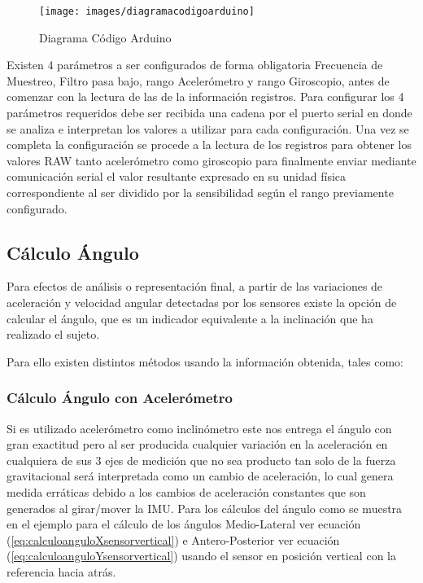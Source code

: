 \documentclass[12pt,a4paper]{article}
\begin{document}
\begin{figure}[H]
	\centering
	\texttt{[image: images/diagramacodigoarduino]}
	\caption{Diagrama Código Arduino}
	\label{fig:arduinocode}
\end{figure}

Existen 4 parámetros a ser configurados de forma obligatoria Frecuencia de Muestreo, Filtro pasa bajo, rango Acelerómetro y rango Giroscopio, antes de comenzar con la lectura de las de la información registros.
Para configurar los 4 parámetros requeridos debe ser recibida una cadena por el puerto serial en donde se analiza e interpretan los valores a utilizar para cada configuración. 
Una vez se completa la configuración se procede a la lectura de los registros para obtener los valores RAW tanto acelerómetro como giroscopio para finalmente enviar mediante comunicación serial el valor resultante expresado en su unidad física correspondiente al ser dividido por la sensibilidad según el rango previamente configurado.


\subsection{Cálculo Ángulo} 
Para efectos de análisis o representación final, a partir de las variaciones de aceleración y velocidad angular detectadas por los sensores existe la opción de calcular el ángulo, que es un indicador equivalente a la inclinación que ha realizado el sujeto.

Para ello existen distintos métodos usando la información obtenida, tales como:


\subsubsection{Cálculo Ángulo con Acelerómetro} Si es utilizado acelerómetro como inclinómetro este nos entrega el ángulo con gran exactitud pero al ser producida cualquier variación en la aceleración en cualquiera de sus 3 ejes de medición que no sea producto tan solo de la fuerza gravitacional será interpretada como un cambio de aceleración, lo cual genera medida erráticas debido a los cambios de aceleración constantes que son generados al girar/mover la IMU.
Para los cálculos del ángulo como se muestra en el ejemplo para el cálculo de los ángulos Medio-Lateral ver ecuación (\ref{eq:calculoanguloXsensorvertical}) e Antero-Posterior ver ecuación (\ref{eq:calculoanguloYsensorvertical}) usando el sensor en posición vertical con la referencia hacia atrás.
\end{document}
